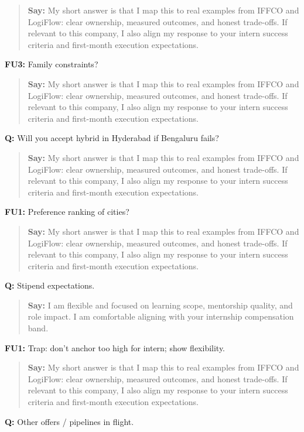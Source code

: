 \documentclass[9pt,a4paper]{article}
\begin{document}
\begin{quote}\small\textbf{Say:} My short answer is that I map this to real examples from IFFCO and LogiFlow: clear ownership, measured outcomes, and honest trade-offs. If relevant to this company, I also align my response to your intern success criteria and first-month execution expectations.\end{quote}
\vspace{2mm}
\textbf{FU3:} Family constraints?

\begin{quote}\small\textbf{Say:} My short answer is that I map this to real examples from IFFCO and LogiFlow: clear ownership, measured outcomes, and honest trade-offs. If relevant to this company, I also align my response to your intern success criteria and first-month execution expectations.\end{quote}
\vspace{2mm}
\textbf{Q:} Will you accept hybrid in Hyderabad if Bengaluru fails?

\begin{quote}\small\textbf{Say:} My short answer is that I map this to real examples from IFFCO and LogiFlow: clear ownership, measured outcomes, and honest trade-offs. If relevant to this company, I also align my response to your intern success criteria and first-month execution expectations.\end{quote}
\vspace{2mm}
\textbf{FU1:} Preference ranking of cities?

\begin{quote}\small\textbf{Say:} My short answer is that I map this to real examples from IFFCO and LogiFlow: clear ownership, measured outcomes, and honest trade-offs. If relevant to this company, I also align my response to your intern success criteria and first-month execution expectations.\end{quote}
\vspace{2mm}
\textbf{Q:} Stipend expectations.

\begin{quote}\small\textbf{Say:} I am flexible and focused on learning scope, mentorship quality, and role impact. I am comfortable aligning with your internship compensation band.\end{quote}
\vspace{2mm}
\textbf{FU1:} Trap: don't anchor too high for intern; show flexibility.

\begin{quote}\small\textbf{Say:} My short answer is that I map this to real examples from IFFCO and LogiFlow: clear ownership, measured outcomes, and honest trade-offs. If relevant to this company, I also align my response to your intern success criteria and first-month execution expectations.\end{quote}
\vspace{2mm}
\textbf{Q:} Other offers / pipelines in flight.
\end{document}
